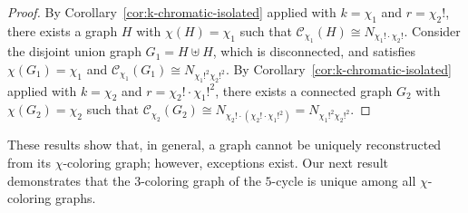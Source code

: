 \documentclass{amsart}
\theoremstyle{hypothesisstyle}
\theoremstyle{definition}
\theoremstyle{remark}
\numberwithin{equation}{section}
\begin{document}
\begin{proof}
By Corollary~\ref{cor:k-chromatic-isolated} applied with $k=\chi_1$ and $r=\chi_2!$, there exists a graph $H$ with $\chi(H)=\chi_1$ such that $\mathcal{C}_{\chi_1}(H)\cong N_{\chi_1!\cdot \chi_2!}$. Consider the disjoint union graph $G_1=H\uplus H$, which is disconnected, and satisfies $\chi(G_1)=\chi_1$ and $\mathcal{C}_{\chi_1}(G_1) \cong N_{\chi_1!^2 \chi_2!^2}$. By Corollary~\ref{cor:k-chromatic-isolated} applied with $k=\chi_2$ and $r=\chi_2!\cdot \chi_1!^2$, there exists a connected graph $G_2$ with $\chi(G_2)=\chi_2$ such that $\mathcal{C}_{\chi_2}(G_2)\cong N_{\chi_2!\cdot (\chi_2!\cdot \chi_1!^2)} = N_{\chi_1!^2 \chi_2!^2}$. 
\end{proof}

These results show that, in general, a graph cannot be uniquely reconstructed from its $\chi$-coloring graph; however, exceptions exist. Our next result demonstrates that the $3$-coloring graph of the $5$-cycle is unique among all $\chi$-coloring graphs.
\end{document}
